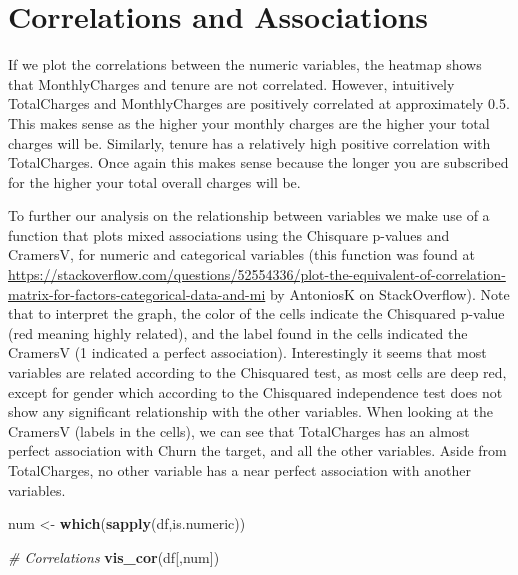 \documentclass[
]{article}
\newenvironment{Shaded}{\begin{snugshade}}{\end{snugshade}}
\newcommand{\CommentTok}[1]{\textcolor[rgb]{0.56,0.35,0.01}{\textit{#1}}}
\newcommand{\FunctionTok}[1]{\textcolor[rgb]{0.13,0.29,0.53}{\textbf{#1}}}
\newcommand{\NormalTok}[1]{#1}
\newcommand{\OtherTok}[1]{\textcolor[rgb]{0.56,0.35,0.01}{#1}}
\begin{document}
\hypertarget{correlations-and-associations}{%
\section{Correlations and
Associations}\label{correlations-and-associations}}

If we plot the correlations between the numeric variables, the heatmap
shows that MonthlyCharges and tenure are not correlated. However,
intuitively TotalCharges and MonthlyCharges are positively correlated at
approximately 0.5. This makes sense as the higher your monthly charges
are the higher your total charges will be. Similarly, tenure has a
relatively high positive correlation with TotalCharges. Once again this
makes sense because the longer you are subscribed for the higher your
total overall charges will be.

To further our analysis on the relationship between variables we make
use of a function that plots mixed associations using the Chisquare
p-values and CramersV, for numeric and categorical variables (this
function was found at
\url{https://stackoverflow.com/questions/52554336/plot-the-equivalent-of-correlation-matrix-for-factors-categorical-data-and-mi}
by AntoniosK on StackOverflow). Note that to interpret the graph, the
color of the cells indicate the Chisquared p-value (red meaning highly
related), and the label found in the cells indicated the CramersV (1
indicated a perfect association). Interestingly it seems that most
variables are related according to the Chisquared test, as most cells
are deep red, except for gender which according to the Chisquared
independence test does not show any significant relationship with the
other variables. When looking at the CramersV (labels in the cells), we
can see that TotalCharges has an almost perfect association with Churn
the target, and all the other variables. Aside from TotalCharges, no
other variable has a near perfect association with another variables.

\begin{Shaded}
\begin{Highlighting}[]
\NormalTok{num }\OtherTok{\textless{}{-}} \FunctionTok{which}\NormalTok{(}\FunctionTok{sapply}\NormalTok{(df,is.numeric))}

\CommentTok{\# Correlations}
\FunctionTok{vis\_cor}\NormalTok{(df[,num])}
\end{Highlighting}
\end{Shaded}
\end{document}
